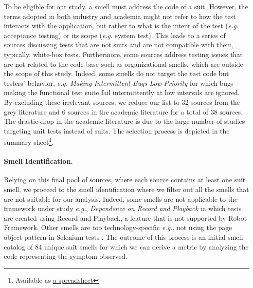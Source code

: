 To be eligible for our study, a smell must address the code of a \gls{suit}. However, the terms adopted in both industry and academia might not refer to how the test interacts with the application, but rather to what is the intent of the test (\emph{e.g.} acceptance testing) or its scope (\emph{e.g.} system test). This leads to a series of sources discussing tests that are not \gls{suit}s and are not compatible with them, typically, white-box tests. Furthermore, some sources address testing issues that are not related to the code base such as organizational smells, which are outside the scope of this study. Indeed, some smells do not target the test code but testers' behavior, \emph{e.g.} \emph{Making Intermittent Bugs Low Priority} \cite{StackExchange2017} for which bugs making the functional test suite fail intermittently at low intervals are ignored. By excluding these irrelevant sources, we reduce our list to 32 sources from the grey literature and 6 sources in the academic literature for a total of 38 sources. The drastic drop in the academic literature is due to the large number of studies targeting unit tests instead of \gls{suit}s.
The selection process is depicted in the summary sheet\footnote{Available as \href{https://docs.google.com/spreadsheets/d/e/2PACX-1vQ78jmOjU3qTOlGzwCSkidJOliPKNDQhmuOxSsfTaRqFVjmFP41JUbYQeupqU_lGCK6L4EpQ3FHNGhU/pubhtml}{a spreadsheet}}.

\paragraph{\textbf{Smell Identification.}}

Relying on this final pool of sources, where each source contains at least one \gls{suit} smell, we proceed to the smell identification where we filter out all the smells that are not suitable for our analysis. Indeed, some smells are not applicable to the framework under study \emph{e.g.}, \emph{Dependence on Record and Playback} \cite{StackExchange2017} in which tests are created using Record and Playback, a feature that is not supported by Robot Framework. Other smells are too technology-specific \emph{e.g.}, not using the page object pattern in Selenium tests \cite{Advolodkin2018}. The outcome of this process is an initial smell catalog of 84 unique \gls{suit} smells for which we can derive a metric by analyzing the code representing the symptom observed.

